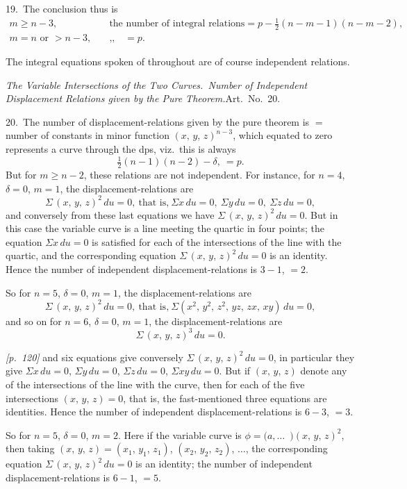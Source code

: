 \documentclass[11pt,a4paper]{article}
\theoremstyle{plain}
\theoremstyle{definition}
\theoremstyle{remark}
\begin{document}
19.\ The conclusion thus is
\begin{align*}
m \geq n - 3, &\quad \text{the number of integral relations} = p - \tfrac{1}{2}(n - m - 1)(n - m - 2),\\
m = n \text{ or } > n - 3, &\quad \text{,,} \quad = p.
\end{align*}

The integral equations spoken of throughout are of course independent relations.

\textit{The Variable Intersections of the Two Curves.\ Number of Independent Displacement Relations given by the Pure Theorem.}\quad Art.\ No.~20.

20.\ The number of displacement-relations given by the pure theorem is $=$ number of constants in minor function $(x,\,y,\,z)^{n-3}$, which equated to zero represents a curve through the dps, viz.\ this is always
\[
\tfrac{1}{2}(n - 1)(n - 2) - \delta,\ = p.
\]
But for $m \geq n - 2$, these relations are not independent. For instance, for $n = 4$, $\delta = 0$, $m = 1$, the displacement-relations are
\[
\Sigma\,(x,\,y,\,z)^2\,du = 0,\ \text{that is,}\ \Sigma x\,du = 0,\ \Sigma y\,du = 0,\ \Sigma z\,du = 0,
\]
and conversely from these last equations we have $\Sigma\,(x,\,y,\,z)^2\,du = 0$. But in this case the variable curve is a line meeting the quartic in four points; the equation $\Sigma x\,du = 0$ is satisfied for each of the intersections of the line with the quartic, and the corresponding equation $\Sigma\,(x,\,y,\,z)^2\,du = 0$ is an identity. Hence the number of independent displacement-relations is $3 - 1$, $= 2$.

So for $n = 5$, $\delta = 0$, $m = 1$, the displacement-relations are
\[
\Sigma\,(x,\,y,\,z)^2\,du = 0,\ \text{that is,}\ \Sigma (x^2,\,y^2,\,z^2,\,yz,\,zx,\,xy)\,du = 0,
\]
and so on for $n = 6$, $\delta = 0$, $m = 1$, the displacement-relations are
\[
\Sigma\,(x,\,y,\,z)^3\,du = 0.
\]

\noindent\textit{[p.~120]} and six equations give conversely $\Sigma\,(x,\,y,\,z)^2\,du = 0$, in particular they give $\Sigma x\,du = 0$, $\Sigma y\,du = 0$, $\Sigma z\,du = 0$, $\Sigma xy\,du = 0$. But if $(x,\,y,\,z)$ denote any of the intersections of the line with the curve, then for each of the five intersections $(x,\,y,\,z) = 0$, that is, the fast-mentioned three equations are identities. Hence the number of independent displacement-relations is $6 - 3$, $= 3$.

So for $n = 5$, $\delta = 0$, $m = 2$. Here if the variable curve is $\phi = (a,\ldots\!{\,\,\,)}(x,\,y,\,z)^2$, then taking $(x,\,y,\,z) = (x_1,\,y_1,\,z_1)$, $(x_2,\,y_2,\,z_2)$, $\ldots$, the corresponding equation $\Sigma\,(x,\,y,\,z)^2\,du = 0$ is an identity; the number of independent displacement-relations is $6 - 1$, $= 5$.
\end{document}
